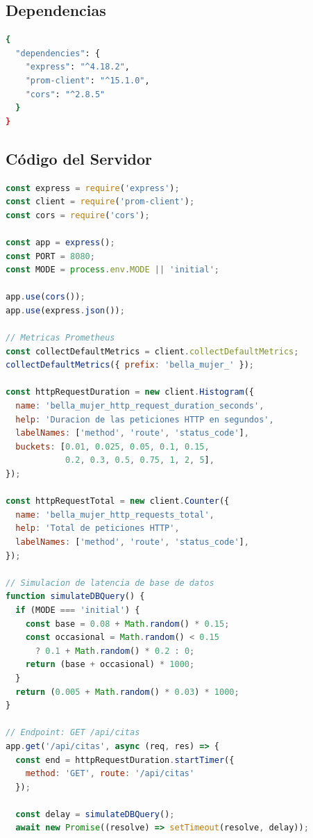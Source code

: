 \documentclass[12pt, a4paper]{article}
\begin{document}
\subsection{Dependencias}

\begin{lstlisting}[language=bash, caption={package.json}]
{
  "dependencies": {
    "express": "^4.18.2",
    "prom-client": "^15.1.0",
    "cors": "^2.8.5"
  }
}
\end{lstlisting}

\subsection{Código del Servidor}

\begin{lstlisting}[language=JavaScript, caption={server.js - API Express con métricas Prometheus}, label={lst:server}]
const express = require('express');
const client = require('prom-client');
const cors = require('cors');

const app = express();
const PORT = 8080;
const MODE = process.env.MODE || 'initial';

app.use(cors());
app.use(express.json());

// Metricas Prometheus
const collectDefaultMetrics = client.collectDefaultMetrics;
collectDefaultMetrics({ prefix: 'bella_mujer_' });

const httpRequestDuration = new client.Histogram({
  name: 'bella_mujer_http_request_duration_seconds',
  help: 'Duracion de las peticiones HTTP en segundos',
  labelNames: ['method', 'route', 'status_code'],
  buckets: [0.01, 0.025, 0.05, 0.1, 0.15,
            0.2, 0.3, 0.5, 0.75, 1, 2, 5],
});

const httpRequestTotal = new client.Counter({
  name: 'bella_mujer_http_requests_total',
  help: 'Total de peticiones HTTP',
  labelNames: ['method', 'route', 'status_code'],
});

// Simulacion de latencia de base de datos
function simulateDBQuery() {
  if (MODE === 'initial') {
    const base = 0.08 + Math.random() * 0.15;
    const occasional = Math.random() < 0.15
      ? 0.1 + Math.random() * 0.2 : 0;
    return (base + occasional) * 1000;
  }
  return (0.005 + Math.random() * 0.03) * 1000;
}

// Endpoint: GET /api/citas
app.get('/api/citas', async (req, res) => {
  const end = httpRequestDuration.startTimer({
    method: 'GET', route: '/api/citas'
  });

  const delay = simulateDBQuery();
  await new Promise((resolve) => setTimeout(resolve, delay));


\end{lstlisting}
\end{document}
